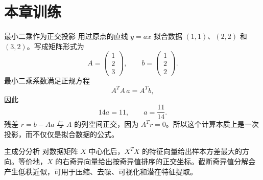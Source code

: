 \section{本章训练}

\begin{workedexample}{最小二乘作为正交投影}
用过原点的直线 $y=ax$ 拟合数据 $(1,1)$、$(2,2)$ 和 $(3,2)$。写成矩阵形式为
\[
    A=\begin{pmatrix}1\\2\\3\end{pmatrix},
    \qquad
    b=\begin{pmatrix}1\\2\\2\end{pmatrix}.
\]
最小二乘系数满足正规方程
\[
    A^{T}A\,a=A^{T}b,
\]
因此
\[
    14a=11,
    \qquad a=\frac{11}{14}.
\]
残差 $r=b-Aa$ 与 $A$ 的列空间正交，因为 $A^Tr=0$。所以这个计算本质上是一次投影，而不仅仅是拟合数据的公式。
\end{workedexample}

\begin{applicationbox}{主成分分析}
对数据矩阵 $X$ 中心化后，$X^TX$ 的特征向量给出样本方差最大的方向。等价地，$X$ 的右奇异向量给出按奇异值排序的正交坐标。截断奇异值分解会产生低秩近似，可用于压缩、去噪、可视化和潜在特征提取。
\end{applicationbox}

